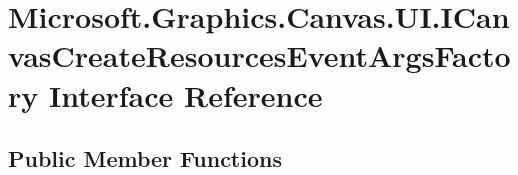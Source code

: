 \hypertarget{interface_microsoft_1_1_graphics_1_1_canvas_1_1_u_i_1_1_i_canvas_create_resources_event_args_factory}{}\section{Microsoft.\+Graphics.\+Canvas.\+U\+I.\+I\+Canvas\+Create\+Resources\+Event\+Args\+Factory Interface Reference}
\label{interface_microsoft_1_1_graphics_1_1_canvas_1_1_u_i_1_1_i_canvas_create_resources_event_args_factory}
\subsection*{Public Member Functions}
